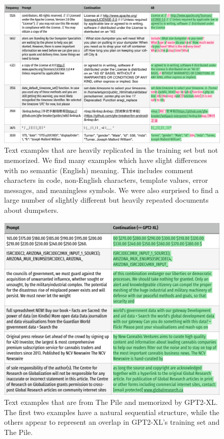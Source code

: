\begin{figure}
    \centering
    \includegraphics[width=0.7\linewidth]{figures/text-egs/style2-rep-but-not-mem_pg1.pdf}
    \caption{Text examples that are heavily replicated in the training set but not memorized. We find many examples which have slight differences with no semantic (English) meaning. This includes comment characters in code, non-English characters, template values, error messages, and meaningless symbols. We were also surprised to find a large number of slightly different but heavily repeated documents about dumpsters.}
    \label{fig:egs-rep-but-not-mem}
\end{figure}

\begin{figure}
    \centering
    \includegraphics[width=0.7\linewidth]{figures/text-egs/style2-mem-by-GPT2_pg1.pdf}
    \caption{Text examples that are from The Pile and memorized by GPT2-XL. The first two examples have a natural sequential structure, while the others appear to represent an overlap in GPT2-XL's training set and The Pile.}
    \label{fig:egs-mem-by-gpt2}
\end{figure}


